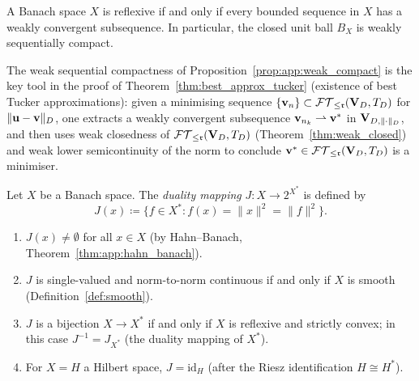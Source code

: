 \begin{proposition}
\label{prop:app:weak_compact}
A Banach space $X$ is reflexive if and only if every bounded sequence
in $X$ has a weakly convergent subsequence. In particular, the closed
unit ball $B_X$ is weakly sequentially compact.
\end{proposition}

\begin{remark}
The weak sequential compactness of Proposition~\ref{prop:app:weak_compact}
is the key tool in the proof of Theorem~\ref{thm:best_approx_tucker}
(existence of best Tucker approximations): given a minimising sequence
$\{\mathbf{v}_n\} \subset \mathcal{FT}_{\leq \mathfrak{r}}(\mathbf{V}_D,T_D)$ for $\|\mathbf{u} - \mathbf{v}\|_D$, one
extracts a weakly convergent subsequence $\mathbf{v}_{n_k} \rightharpoonup \mathbf{v}^*$
in $\mathbf{V}_{D,\|\cdot\|_D}$, and then uses weak closedness of $\mathcal{FT}_{\leq \mathfrak{r}}(\mathbf{V}_D,T_D)$
(Theorem~\ref{thm:weak_closed}) and weak lower semicontinuity of the
norm to conclude $\mathbf{v}^* \in \mathcal{FT}_{\leq \mathfrak{r}}(\mathbf{V}_D,T_D)$ is a minimiser.
\end{remark}

\begin{proposition}
\label{prop:app:duality_mapping}
Let $X$ be a Banach space. The \emph{duality mapping} $J: X \to 2^{X^*}$
is defined by
\begin{equation}
    J(x) \coloneqq \{f \in X^* : f(x) = \|x\|^2 = \|f\|^2\}.
\end{equation}
\begin{enumerate}
\item[\textup{(i)}] $J(x) \neq \emptyset$ for all $x \in X$ (by
    Hahn--Banach, Theorem~\ref{thm:app:hahn_banach}).
\item[\textup{(ii)}] $J$ is single-valued and norm-to-norm continuous
    if and only if $X$ is smooth (Definition~\ref{def:smooth}).
\item[\textup{(iii)}] $J$ is a bijection $X \to X^*$ if and only if
    $X$ is reflexive and strictly convex; in this case
    $J^{-1} = J_{X^*}$ (the duality mapping of $X^*$).
\item[\textup{(iv)}] For $X = H$ a Hilbert space, $J = \mathrm{id}_H$
    (after the Riesz identification $H \cong H^*$).
\end{enumerate}
\end{proposition}

